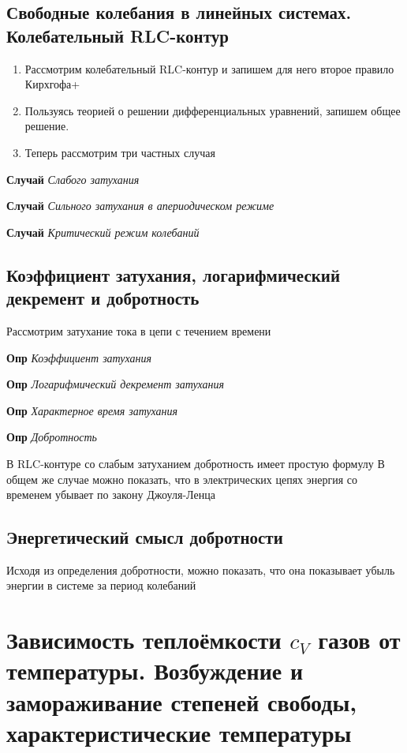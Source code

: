 \documentclass[a4paper, 14pt]{article}
\begin{document}
    \subsection{Свободные колебания в линейных системах. Колебательный RLC-контур}
    
    \begin{enumerate}
        \item Рассмотрим колебательный RLC-контур и запишем для него второе правило Кирхгофа+
        \item Пользуясь теорией о решении дифференциальных уравнений, запишем общее решение.
        \item Теперь рассмотрим три частных случая
    \end{enumerate}
    
    \textbf{Случай} \textit{Слабого затухания}
    
    \textbf{Случай} \textit{Сильного затухания в апериодическом режиме}
    
    \textbf{Случай} \textit{Критический режим колебаний}
    
    \subsection{Коэффициент затухания, логарифмический декремент и добротность}
    
    Рассмотрим затухание тока в цепи с течением времени
    
    \textbf{Опр} \textit{Коэффициент затухания}
    
    \textbf{Опр} \textit{Логарифмический декремент затухания}
    
    \textbf{Опр} \textit{Характерное время затухания}
    
    \textbf{Опр} \textit{Добротность}
    
    В RLC-контуре со слабым затуханием добротность имеет простую формулу
    В общем же случае можно показать, что в электрических цепях энергия со временем убывает по закону Джоуля-Ленца
    
    \subsection{Энергетический смысл добротности}
    
    Исходя из определения добротности, можно показать, что она показывает убыль энергии в системе за период колебаний
    
    \section{Зависимость теплоёмкости $c_V$ газов от температуры.
    Возбуждение и замораживание степеней свободы, характеристические температуры}
    
\end{document}
